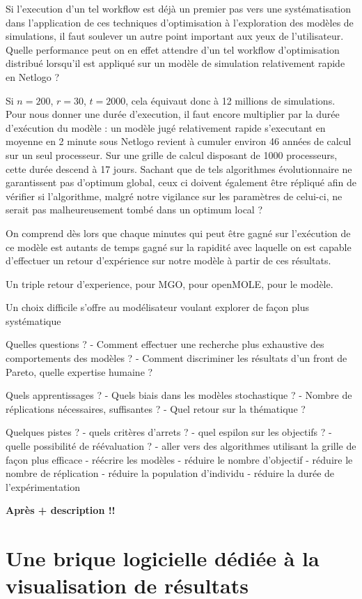 Si l'execution d'un tel workflow est déjà un premier pas vers une systématisation dans l'application de ces techniques d'optimisation à l'exploration des modèles de simulations, il faut soulever un autre point important aux yeux de l'utilisateur. Quelle performance peut on en effet attendre d'un tel workflow d'optimisation distribué lorsqu'il est appliqué sur un modèle de simulation relativement rapide en Netlogo ?

Si $n=200$, $r = 30$, $t=2000$, cela équivaut donc à 12 millions de simulations. Pour nous donner une durée d'execution, il faut encore multiplier par la durée d'exécution du modèle : un modèle jugé relativement rapide s'executant en moyenne en 2 minute sous Netlogo revient à cumuler environ 46 années de calcul sur un seul processeur. Sur une grille de calcul disposant de 1000 processeurs, cette durée descend à 17 jours. Sachant que de tels algorithmes évolutionnaire ne garantissent pas d'optimum global, ceux ci doivent également être répliqué afin de vérifier si l'algorithme, malgré notre vigilance sur les paramètres de celui-ci, ne serait pas malheureusement tombé dans un optimum local ?

On comprend dès lors que chaque minutes qui peut être gagné sur l'exécution de ce modèle est autants de temps gagné sur la rapidité avec laquelle on est capable d'effectuer un retour d'expérience sur notre modèle à partir de ces résultats.


Un triple retour d'experience, pour MGO, pour openMOLE, pour le modèle.

Un choix difficile s'offre au modélisateur voulant explorer de façon plus systématique

Quelles questions ?
- Comment effectuer une recherche plus exhaustive des comportements des modèles ?
- Comment discriminer les résultats d'un front de Pareto, quelle expertise humaine ?

Quels apprentissages ?
- Quels biais dans les modèles stochastique ?
- Nombre de réplications nécessaires, suffisantes ?
- Quel retour sur la thématique ?

Quelques pistes ?
- quels critères d'arrets ?
- quel espilon sur les objectifs ?
- quelle possibilité de réévaluation ?
- aller vers des algorithmes utilisant la grille de façon plus efficace
- réécrire les modèles
- réduire le nombre d'objectif
- réduire le nombre de réplication
- réduire la population d'individu
- réduire la durée de l'expérimentation





\textbf{Après + description !!}




\section{Une brique logicielle dédiée à la visualisation de résultats}
